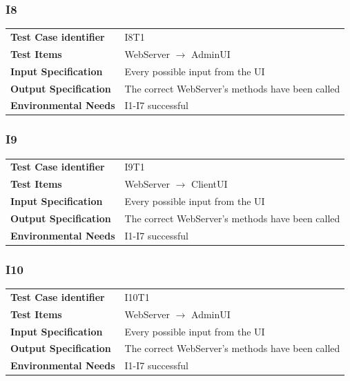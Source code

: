\documentclass{article}
\begin{document}
\subsubsection{I8}
\begin{adjustbox}{width=1.2\textwidth}	
	\begin{tabular}{*{2}{p{}}}
		\toprule
		\textbf{Test Case identifier} & I8T1\\
		\textbf{Test Items} & WebServer $\rightarrow$ AdminUI\\
		\textbf{Input Specification} & Every possible input from the UI\\ 
		\textbf{Output Specification} & The correct WebServer's methods have been called\\
		\textbf{Environmental Needs} & I1-I7 successful\\
		\bottomrule
	\end{tabular}
\end{adjustbox}
\subsubsection{I9}
\begin{adjustbox}{width=1.2\textwidth}	
	\begin{tabular}{*{2}{p{}}}
		\toprule
		\textbf{Test Case identifier} & I9T1\\
		\textbf{Test Items} & WebServer $\rightarrow$ ClientUI\\
		\textbf{Input Specification} & Every possible input from the UI\\ 
		\textbf{Output Specification} & The correct WebServer's methods have been called\\
		\textbf{Environmental Needs} & I1-I7 successful\\
		\bottomrule
	\end{tabular}
\end{adjustbox}
\subsubsection{I10}
\begin{adjustbox}{width=1.2\textwidth}	
	\begin{tabular}{*{2}{p{}}}
		\toprule
		\textbf{Test Case identifier} & I10T1\\
		\textbf{Test Items} & WebServer $\rightarrow$ AdminUI\\
		\textbf{Input Specification} & Every possible input from the UI\\ 
		\textbf{Output Specification} & The correct WebServer's methods have been called\\
		\textbf{Environmental Needs} & I1-I7 successful\\
		\bottomrule
	\end{tabular}
\end{adjustbox}
\end{document}
